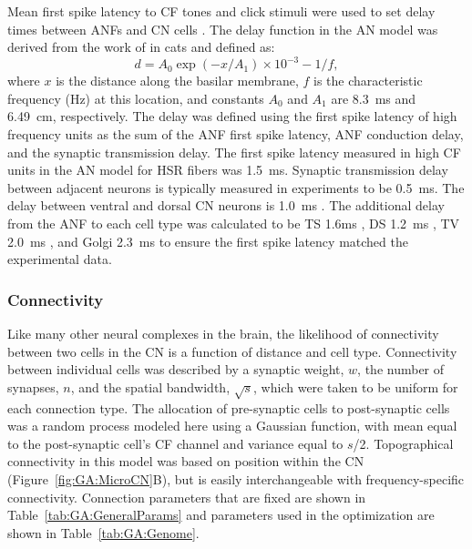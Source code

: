 Mean first spike latency to CF tones and click stimuli were used to
set delay times between ANFs and CN cells
\citep{EagerGraydenEtAl:2006}. The delay function in the AN model was
derived from the work of \citet{CarneyYin:1988} in cats and
defined as:
\begin{equation} \label{eq:GA:delay} 
d=A_{0} \exp(-x/A_{1})\times 10^{- 3} -1/f,
\end{equation}
where $x$ is the distance along the basilar membrane, $f$ is the
characteristic frequency (Hz) at this location, and constants $A_0$
and $A_1$ are 8.3~ms and 6.49~cm, respectively. The delay was defined
using the first spike latency of high frequency units as the sum of
the ANF first spike latency, ANF conduction delay, and the synaptic
transmission delay.  The first spike latency measured in high CF units
in the AN model for HSR fibers was 1.5~ms.  Synaptic transmission
delay between adjacent neurons is typically measured in experiments to
be 0.5~ms. The delay between ventral and dorsal CN neurons is 1.0~ms
\citep{WickesbergOertel:1993}.  The additional delay from the ANF to
each cell type was calculated to be TS 1.6ms \citep{RhodeSmith:1986},
DS 1.2~ms \citep{RhodeOertelEtAl:1983}, TV 2.0~ms
\citep{SpirouDavisEtAl:1999}, and Golgi 2.3~ms
\citep{FerragamoGoldingEtAl:1998a} to ensure the first spike latency
matched the experimental data.

\subsubsection{Connectivity}\label{sec:GA:connectivity}

Like many other neural complexes in the brain, the likelihood of
connectivity between two cells in the CN is a function of distance and
cell type. Connectivity between individual cells was described by a
synaptic weight, $w$, the number of synapses, $n$, and the spatial
bandwidth, $\sqrt{s} $, which were taken to be uniform for each
connection type.  The allocation of pre-synaptic cells to
post-synaptic cells was a random process modeled here using a Gaussian
function, with mean equal to the post-synaptic cell's CF channel and
variance equal to $s$/2. Topographical connectivity in this model was
based on position within the CN (Figure~\ref{fig:GA:MicroCN}B), but is
easily interchangeable with frequency-specific connectivity.
Connection parameters that are fixed are shown in
Table~\ref{tab:GA:GeneralParams} and parameters used in the
optimization are shown in Table~\ref{tab:GA:Genome}.

